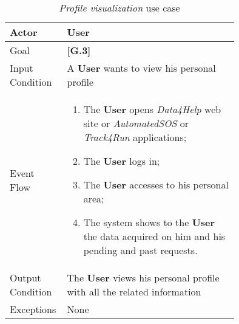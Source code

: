 \begin{center}
\begin{table}
\begin{tabular}{ | l | p{0.75\linewidth} | }
  \hline
    Actor & \textbf{User} \\ \hline
    Goal & \textbf{[G.3]} \\ \hline
    Input Condition & A \textbf{User} wants to view his personal profile\\ \hline
    Event Flow & \begin{minipage}[t]{0.7\textwidth}
      \begin{enumerate}
        \item The \textbf{User} opens \textit{Data4Help} web site or \textit{AutomatedSOS} or \textit{Track4Run} applications;
        \item The \textbf{User} logs in;
        \item The \textbf{User} accesses to his personal area;
        \item The system shows to the \textbf{User} the data acquired on him and his pending and past requests.
      \end{enumerate}
    \smallskip
  \end{minipage} \\ \hline
  Output Condition & The \textbf{User} views his personal profile with all the related information\\ \hline
  Exceptions & None \\ \hline
\end{tabular}
\caption{\textit{Profile visualization} use case}
\label{table:profileVisualizationTable}
\end{table}
\end{center}

